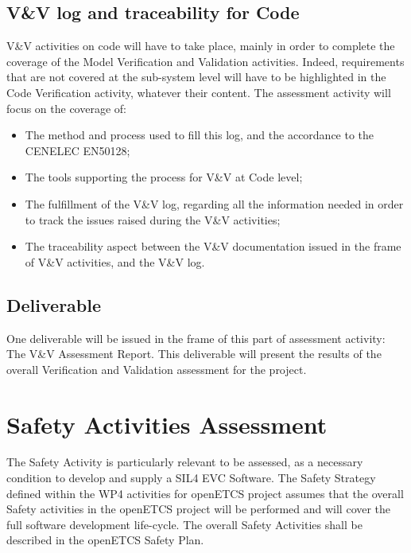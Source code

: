 \documentclass[openetcs]{template/openetcs_article}
\begin{document}
\subsection{V\&V log and traceability for Code}
V\&V activities on code will have to take place, mainly in order to complete the coverage of the Model Verification and Validation activities. Indeed,
requirements that are not covered at the sub-system level will have to be highlighted in the Code Verification activity, whatever their content.
The assessment activity will focus on the coverage of:
\begin{itemize}
\item The method and process used to fill this log, and the accordance to the CENELEC EN50128;
\item The tools supporting the process for V\&V at Code level;
\item The fulfillment of the V\&V log, regarding all the information needed in order to track the issues raised during the V\&V activities;
\item The traceability aspect between the V\&V documentation issued in the frame of V\&V activities, and the V\&V log.
\end{itemize}

\subsection{Deliverable}
One deliverable will be issued in the frame of this part of assessment activity: The V\&V Assessment Report. This deliverable will present the results
of the overall Verification and Validation assessment for the project.

\section{Safety Activities Assessment}
The Safety Activity is particularly relevant to be assessed, as a necessary condition to develop and supply a SIL4 EVC Software. The Safety Strategy defined
within the WP4 activities for openETCS project assumes that the overall Safety activities in the openETCS project will be performed and will cover the full software development life-cycle.
The overall Safety Activities shall be described in the openETCS Safety Plan.
\end{document}
